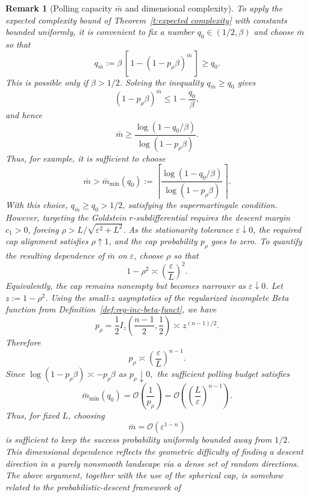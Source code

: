 \documentclass[11pt,a4paper]{article}
\newtheorem{remark}{Remark}[section]
\newcommand{\goldelta}{r}
\begin{document}
\begin{remark}[Polling capacity \(\bar{m}\) and dimensional complexity]
\label{rem:M-lower-bound}
To apply the expected complexity bound of Theorem~\ref{t:expected complexity}
with constants bounded uniformly, it is convenient to fix a number
\(q_0\in(1/2,\beta)\) and choose \(\bar{m}\) so that
\[
    q_{\bar{m}}
    :=
    \beta\,[\,1-(1-p_\rho\beta)^{\bar{m}}\,]
    \ge q_0 .
\]
This is possible only if \(\beta>1/2\). Solving the inequality
\(q_{\bar{m}}\ge q_0\) gives
\[
    (1-p_\rho\beta)^{\bar{m}}
    \le
    1-\frac{q_0}{\beta},
\]
and hence
\[
    \bar{m}
    \ge
    \frac{\log(1-q_0/\beta)}
         {\log(1-p_\rho\beta)}.
\]
Thus, for example, it is sufficient to choose
\[
    \bar{m}
    >
    \bar{m}_{\min}(q_0)
    :=
    \left\lceil
    \frac{\log(1-q_0/\beta)}
         {\log(1-p_\rho\beta)}
    \right\rceil .
\]
With this choice, \(q_{\bar{m}}\ge q_0>1/2\), satisfying the supermartingale condition. However, targeting the Goldstein $\goldelta$-subdifferential requires the descent margin $c_1 > 0$, forcing $\rho > L / \sqrt{\varepsilon^2 + L^2}$.
As the stationarity tolerance \(\varepsilon\downarrow0\), the required cap
alignment satisfies \(\rho\uparrow1\), and the cap probability \(p_\rho\)
goes to zero. To quantify the resulting dependence of \(\bar{m}\) on \(\varepsilon\), choose
\(\rho\) so that
\[
    1-\rho^2\asymp \left(\frac{\varepsilon}{L}\right)^2 .
\]
Equivalently, the cap remains nonempty but becomes narrower as
\(\varepsilon\downarrow0\). Let \(z:=1-\rho^2\). Using the small-\(z\)
asymptotics of the regularized incomplete Beta function from Definition~\ref{def:reg-inc-beta-funct}, we have
\[
    p_\rho
    =
    \frac12
    I_z\left(\frac{n-1}{2},\frac12\right)
    \asymp
    z^{(n-1)/2}.
\]
Therefore
\[
    p_\rho
    \asymp
    \left(\frac{\varepsilon}{L}\right)^{n-1}.
\]
Since $\log(1-p_\rho\beta)\asymp -p_\rho\beta
    $ as $p_\rho\downarrow0, $
the sufficient polling budget satisfies
\[
    \bar{m}_{\min}(q_0)
    =
    \mathcal O\left(\frac{1}{p_\rho}\right)
    =
    \mathcal O\left(
        \left(\frac{L}{\varepsilon}\right)^{n-1}
    \right).
\]
Thus, for fixed \(L\), choosing
\[
    \bar{m}=\mathcal O(\varepsilon^{1-n})
\]
is sufficient to keep the success probability uniformly bounded away from
\(1/2\). This dimensional dependence reflects the geometric difficulty of
finding a descent direction in a purely nonsmooth landscape via a dense set of random directions.
The above argument, together with the use of the spherical cap, is somehow related to the probabilistic-descent framework of

\end{remark}
\end{document}
